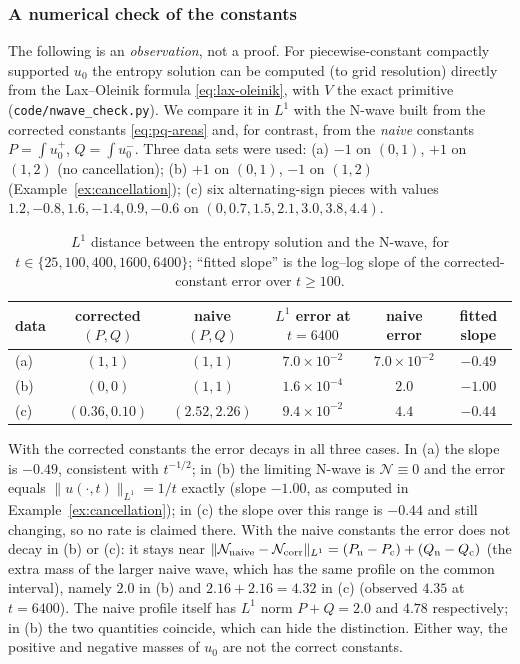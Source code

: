 \subsubsection{A numerical check of the constants}
\label{subsubsec:n-wave-numerics}

The following is an \emph{observation}, not a proof. For piecewise-constant
compactly supported $u_0$ the entropy solution can be computed (to grid
resolution) directly from the Lax--Oleinik formula
\eqref{eq:lax-oleinik}, with $V$ the exact primitive
(\texttt{code/nwave\_check.py}). We compare it in $L^1$ with the N-wave built
from the corrected constants \eqref{eq:pq-areas} and, for contrast, from the
\emph{naive} constants $P=\int u_0^+$, $Q=\int u_0^-$. Three data sets were
used: (a) $-1$ on $(0,1)$, $+1$ on $(1,2)$ (no cancellation); (b)
$+1$ on $(0,1)$, $-1$ on $(1,2)$ (Example~\ref{ex:cancellation}); (c) six
alternating-sign pieces with values $1.2,-0.8,1.6,-1.4,0.9,-0.6$ on
$(0,0.7,1.5,2.1,3.0,3.8,4.4)$.

\begin{table}[h]
\centering
\begin{tabular}{l c c c c c}
  data & corrected $(P,Q)$ & naive $(P,Q)$ & $L^1$ error at $t=6400$ & naive error & fitted slope \\\hline
  (a) & $(1,1)$ & $(1,1)$ & $7.0\times10^{-2}$ & $7.0\times10^{-2}$ & $-0.49$ \\
  (b) & $(0,0)$ & $(1,1)$ & $1.6\times10^{-4}$ & $2.0$ & $-1.00$ \\
  (c) & $(0.36,0.10)$ & $(2.52,2.26)$ & $9.4\times10^{-2}$ & $4.4$ & $-0.44$
\end{tabular}
\caption{$L^1$ distance between the entropy solution and the N-wave, for
$t\in\{25,100,400,1600,6400\}$; ``fitted slope'' is the log--log slope of
the corrected-constant error over $t\ge100$.}
\label{tab:nwave}
\end{table}

With the corrected constants the error decays in all three cases. In (a)
the slope is $-0.49$, consistent with $t^{-1/2}$; in (b) the limiting
N-wave is $\mathcal{N}\equiv0$ and the error equals $\|u(\cdot,t)\|_{L^1}=1/t$ exactly
(slope $-1.00$, as computed in Example~\ref{ex:cancellation}); in (c) the
slope over this range is $-0.44$ and still changing, so no rate is claimed
there. With the naive constants the error does not decay in (b) or (c): it
stays near $\|\mathcal{N}_{\rm naive}-\mathcal{N}_{\rm corr}\|_{L^1}
=(P_{\rm n}-P_{\rm c})+(Q_{\rm n}-Q_{\rm c})$ (the extra mass of the larger
naive wave, which has the same profile on the common interval), namely $2.0$
in (b) and $2.16+2.16=4.32$ in (c) (observed $4.35$ at $t=6400$). The naive
profile itself has $L^1$ norm $P+Q=2.0$ and $4.78$ respectively; in (b) the
two quantities coincide, which can hide the distinction. Either way, the
positive and negative masses of $u_0$ are not the correct constants.
